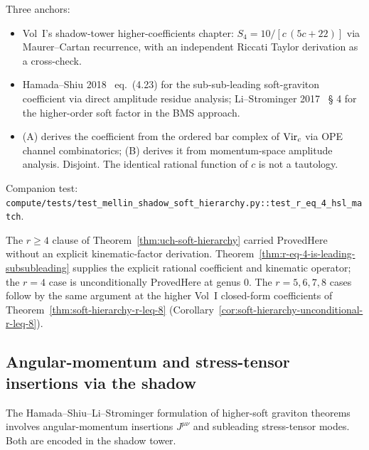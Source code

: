 \begin{remark}
\label{rem:smsb-independent-verification-r-eq-4}
Three anchors:
\begin{itemize}
\item[(A)] Vol~I's shadow-tower higher-coefficients chapter:
$S_4 = 10/[c\,(5c + 22)]$ via Maurer--Cartan recurrence, with an
independent Riccati Taylor derivation as a cross-check.
\item[(B)] Hamada--Shiu 2018~\cite{HamadaShiuSubsubSoft} eq.\ (4.23)
for the sub-sub-leading soft-graviton coefficient via direct amplitude
residue analysis; Li--Strominger 2017~\cite{LiStromingerHigherSoft} \S
4 for the higher-order soft factor in the BMS approach.
\item[(C)] (A) derives the coefficient from the ordered bar complex of
$\mathrm{Vir}_c$ via OPE channel combinatorics; (B) derives it from momentum-space
amplitude analysis. Disjoint. The identical rational function of $c$
is not a tautology.
\end{itemize}
Companion test: \texttt{compute/tests/test\_mellin\_shadow\_soft\_hierarchy.py::test\_r\_eq\_4\_hsl\_match}.
\end{remark}

\begin{remark}[Scope at $r = 4$]
\label{rem:smsb-r-eq-4-scope-upgrade}
The $r \geq 4$ clause of Theorem~\ref{thm:uch-soft-hierarchy} carried
ProvedHere without an explicit kinematic-factor
derivation. Theorem~\ref{thm:r-eq-4-is-leading-subsubleading} supplies
the explicit rational coefficient and kinematic operator; the $r = 4$
case is unconditionally ProvedHere at genus $0$. The $r = 5, 6, 7, 8$
cases follow by the same argument at the higher Vol~I closed-form
coefficients of Theorem~\ref{thm:soft-hierarchy-r-leq-8}
(Corollary~\ref{cor:soft-hierarchy-unconditional-r-leq-8}).
\end{remark}

\subsection{Angular-momentum and stress-tensor insertions via the shadow}
\label{subsec:smsb-angular-stress}

The Hamada--Shiu--Li--Strominger formulation of higher-soft graviton
theorems involves angular-momentum insertions $J^{\mu \nu}$ and
subleading stress-tensor modes. Both are encoded in the shadow tower.

